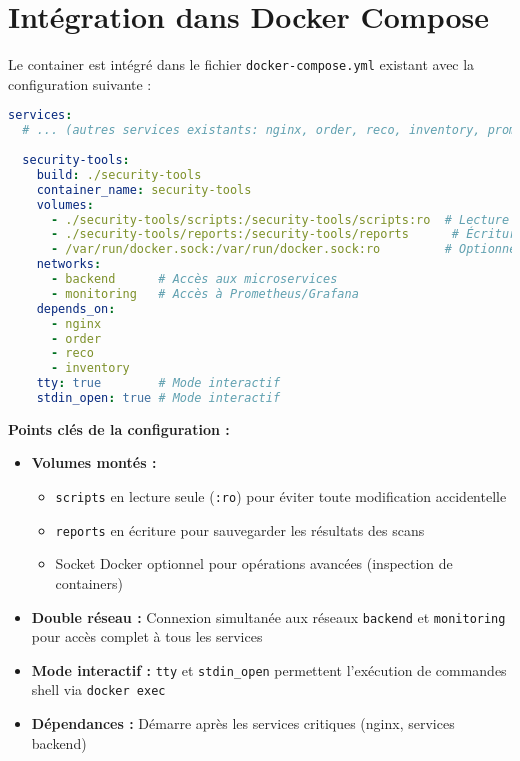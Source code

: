 \documentclass[11pt,a4paper]{report}
\begin{document}
\section{Intégration dans Docker Compose}

Le container est intégré dans le fichier \texttt{docker-compose.yml} existant avec la configuration suivante :

\begin{lstlisting}[language=YAML, caption=Configuration Docker Compose du Container Security Tools, basicstyle=\ttfamily\tiny]
services:
  # ... (autres services existants: nginx, order, reco, inventory, prometheus, grafana)
  
  security-tools:
    build: ./security-tools
    container_name: security-tools
    volumes:
      - ./security-tools/scripts:/security-tools/scripts:ro  # Lecture seule
      - ./security-tools/reports:/security-tools/reports      # Écriture pour rapports
      - /var/run/docker.sock:/var/run/docker.sock:ro         # Optionnel : gestion Docker
    networks:
      - backend      # Accès aux microservices
      - monitoring   # Accès à Prometheus/Grafana
    depends_on:
      - nginx
      - order
      - reco
      - inventory
    tty: true        # Mode interactif
    stdin_open: true # Mode interactif
\end{lstlisting}

\textbf{Points clés de la configuration :}
\begin{itemize}
    \item \textbf{Volumes montés :} 
    \begin{itemize}
        \item \texttt{scripts} en lecture seule (\texttt{:ro}) pour éviter toute modification accidentelle
        \item \texttt{reports} en écriture pour sauvegarder les résultats des scans
        \item Socket Docker optionnel pour opérations avancées (inspection de containers)
    \end{itemize}
    \item \textbf{Double réseau :} Connexion simultanée aux réseaux \texttt{backend} et \texttt{monitoring} pour accès complet à tous les services
    \item \textbf{Mode interactif :} \texttt{tty} et \texttt{stdin\_open} permettent l'exécution de commandes shell via \texttt{docker exec}
    \item \textbf{Dépendances :} Démarre après les services critiques (nginx, services backend)
\end{itemize}
\end{document}
